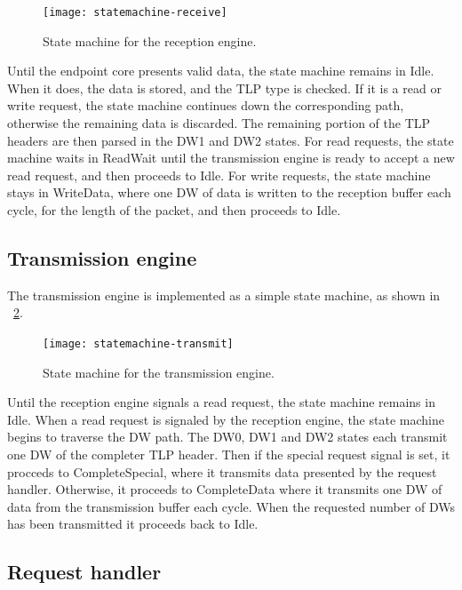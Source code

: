 \begin{figure}[!ht]
    \centering
    \texttt{[image: statemachine-receive]}
    \caption[Reception engine state machine]{
        State machine for the reception engine.
    }
    \label{fig:statemachine-receive}
\end{figure}

Until the endpoint core presents valid data, the state machine remains in Idle.
When it does, the data is stored, and the TLP type is checked.
If it is a read or write request, the state machine continues down the corresponding path, otherwise the remaining data is discarded.
The remaining portion of the TLP headers are then parsed in the DW1 and DW2 states.
For read requests, the state machine waits in ReadWait until the transmission engine is ready to accept a new read request, and then proceeds to Idle.
For write requests, the state machine stays in WriteData, where one DW of data is written to the reception buffer each cycle, for the length of the packet, and then proceeds to Idle.

\subsection{Transmission engine}

The transmission engine is implemented as a simple state machine, as shown in \figurename~\ref{fig:statemachine-transmit}.

\begin{figure}[!ht]
    \centering
    \texttt{[image: statemachine-transmit]}
    \caption[Transmission engine state machine]{
        State machine for the transmission engine.
    }
    \label{fig:statemachine-transmit}
\end{figure}

Until the reception engine signals a read request, the state machine remains in Idle.
When a read request is signaled by the reception engine, the state machine begins to traverse the DW path.
The DW0, DW1 and DW2 states each transmit one DW of the completer TLP header.
Then if the special request signal is set, it procceds to CompleteSpecial, where it transmits data presented by the request handler.
Otherwise, it proceeds to CompleteData where it transmits one DW of data from the transmission buffer each cycle.
When the requested number of DWs has been transmitted it proceeds back to Idle.

\subsection{Request handler}

